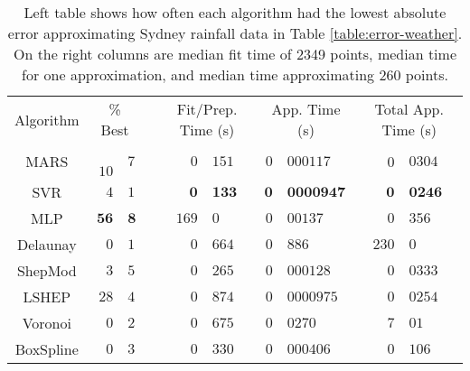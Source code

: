 \documentclass[doublespace,nopageskip]{VTthesis} %
\begin{document}
\begin{appendices}
  \begin{table}
    \centering
    \begin{tabular}{|c|r@{.}l| c |r@{.}l|r@{.}l|r@{.}l|}
      \cline{1-3}\cline{5-10}
      Algorithm & \multicolumn{2}{c|}{\% Best} &  & \multicolumn{2}{c|}{Fit/Prep. Time (s)} & \multicolumn{2}{c|}{App. Time (s)} & \multicolumn{2}{c|}{Total App. Time (s)}\\
      \cline{1-3}\cline{5-10}
      MARS & \,\,\,\,$10$&$7$ &  & \quad\quad\quad$\mathit{0}$&$\mathit{151}$ & \quad$0$&$000117$ & \quad\quad\quad\,\,$0$&$0304$\\
      SVR & $4$&$1$ &  & $\mathbf{0}$&$\mathbf{133}$ & $\mathbf{0}$&$\mathbf{0000947}$ & $\mathbf{0}$&$\mathbf{0246}$\\
      MLP & $\mathbf{56}$&$\mathbf{8}$ &  & $169$&$0$ & $0$&$00137$ & $0$&$356$\\
      Delaunay & $0$&$1$ &  & $0$&$664$ & $0$&$886$ & $230$&$0$\\
      ShepMod & $3$&$5$ &  & $0$&$265$ & $0$&$000128$ & $0$&$0333$\\
      LSHEP & $\mathit{28}$&$\mathit{4}$ &  & $0$&$874$ & $\mathit{0}$&$\mathit{0000975}$ & $\mathit{0}$&$\mathit{0254}$\\
      Voronoi & $0$&$2$ &  & $0$&$675$ & $0$&$0270$ & $7$&$01$\\
      BoxSpline & $0$&$3$ &  & $0$&$330$ & $0$&$000406$ & $0$&$106$\\
      \cline{1-3}\cline{5-10}
    \end{tabular}
    \caption{Left table shows how often each algorithm had the lowest
      absolute error approximating Sydney rainfall data in Table
      \ref{table:error-weather}. On the right columns are median fit
      time of 2349 points, median time for one approximation, and median
      time approximating 260 points.}
    \label{table:best-weather}
  \end{table}



\end{appendices}
\end{document}
